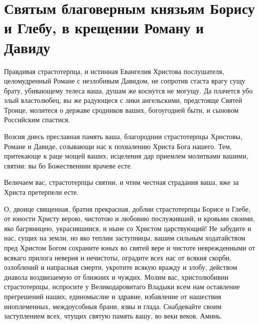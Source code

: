 \section{Святым благоверным князьям Борису и Глебу, в крещении Роману и  Давиду}\begin{mymulticols}
 
{\small{}



Правдивая страстотерпца, и истинная Евангелия Христова послушателя, целомудренный Романе с незлобивым Давидом, не сопротив стаста врагу сущу брату, убивающему телеса ваша, душам же коснутся не могущу. Да плачется убо злый властолюбец, вы же радующеся с лики ангельскими, предстояще Святей Троице, молитеся о державе сродников ваших, богоугодней быти, и сыновом Российским спастися.


Возсия днесь преславная память ваша, благороднии страстотерпцы Христовы, Романе и Давиде, созывающи нас к похвалению Христа Бога нашего. Тем, притекающе к раце мощей ваших, исцеления дар приемлем молитвами вашими, святии: вы бо Божественнии врачеве есте.


Величаем вас, страстотерпцы святии, и чтим честная страдания ваша, яже за Христа претерпели есте.


О, двоице священная, братия прекрасная, доблии страстотерпцы Борисе и Глебе, от юности Христу верою, чистотою и любовию послуживший, и кровьми своими, яко багряницею, украсившиися, и ныне со Христом царствующий! Не забудите и нас, сущих на земли, но яко теплии заступницы, вашим сильным ходатайством пред Христом Богом сохраните юных во святей вере и чистоте неврежденными от всякаго прилога неверия и нечистоты, оградите всех нас от всякия скорби, озлоблений и напрасныя смерти, укротите всякую вражду и злобу, действом диавола воздвизаемую от ближних и чуждих. Молим вас, христолюбивии страстотерпцы, испросите у Великодаровитаго Владыки всем нам оставление прегрешений наших, единомыслие и здравие, избавление от нашествия иноплеменных, междоусобныя брани, язвы и глада. Снабдевайте своим заступлением  всех, чтущих святую память вашу, во веки веков. Аминь.}

\end{mymulticols}

